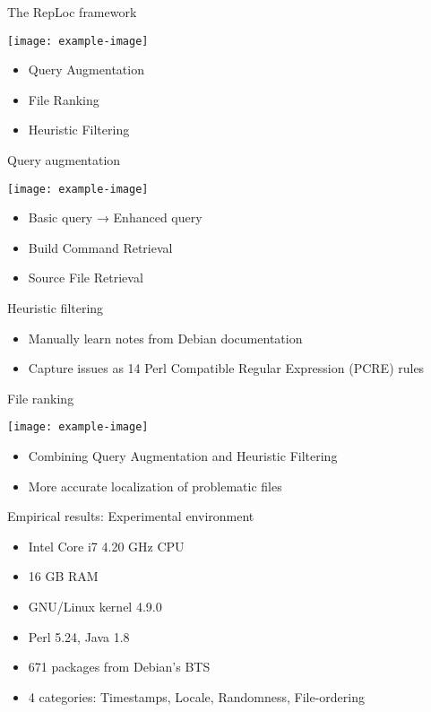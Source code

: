 \documentclass{beamer}
\begin{document}
\begin{frame}{The RepLoc framework}
\begin{center}
\texttt{[image: example-image]}
\end{center}
\begin{itemize}
\item Query Augmentation
\item File Ranking
\item Heuristic Filtering
\end{itemize}
\end{frame}

\begin{frame}{Query augmentation}
\begin{center}
\texttt{[image: example-image]}
\end{center}
\begin{itemize}
\item Basic query → Enhanced query
\item Build Command Retrieval
\item Source File Retrieval
\end{itemize}
\end{frame}

\begin{frame}{Heuristic filtering}
\begin{itemize}
\item Manually learn notes from Debian documentation
\item Capture issues as 14 Perl Compatible Regular Expression (PCRE) rules
\end{itemize}
\end{frame}

\begin{frame}{File ranking}
\begin{center}
\texttt{[image: example-image]}
\end{center}
\begin{itemize}
\item Combining Query Augmentation and Heuristic Filtering
\item More accurate localization of problematic files
\end{itemize}
\end{frame}

\begin{frame}{Empirical results: Experimental environment}
\begin{itemize}
\item Intel Core i7 4.20 GHz CPU
\item 16 GB RAM
\item GNU/Linux kernel 4.9.0
\item Perl 5.24, Java 1.8
\item 671 packages from Debian's BTS
\item 4 categories: Timestamps, Locale, Randomness, File-ordering
\end{itemize}
\end{frame}
\end{document}
